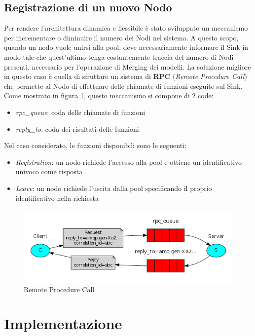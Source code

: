     \subsection{Registrazione di un nuovo Nodo}
      Per rendere l'architettura dinamica e flessibile è stato sviluppato un meccanismo per incrementare o diminuire il numero dei Nodi nel sistema. A questo scopo, quando un nodo vuole unirsi alla pool, deve necessariamente informare il Sink in modo tale che quest'ultimo tenga costantemente traccia del numero di Nodi presenti, necessario per l'operazione di Merging dei modelli. \newline
      La soluzione migliore in questo caso è quella di sfruttare un sistema di \textbf{RPC} (\textit{Remote Procedure Call}) che permette al Nodo di effettuare delle chiamate di funzioni eseguite sul Sink. Come mostrato in figura \ref{fig:RPC}, questo meccanismo si compone di 2 code:
      \begin{itemize}
        \item \textit{rpc\_queue}: coda delle chiamate di funzioni
        \item \textit{reply\_to}: coda dei risultati delle funzioni
      \end{itemize}
      Nel caso considerato, le funzioni disponibili sono le seguenti:
      \begin{itemize}
        \item \textit{Registration}: un nodo richiede l'accesso alla pool e ottiene un identificativo univoco come risposta
        \item \textit{Leave}: un nodo richiede l'uscita dalla pool specificando il proprio identificativo nella richiesta
      \end{itemize}
      \begin{figure}[h!]
        \centering
        \includegraphics[scale=0.7]{../Immagini/RPC.png}
        \caption{Remote Procedure Call}
        \label{fig:RPC}
      \end{figure}


  \section{Implementazione}
